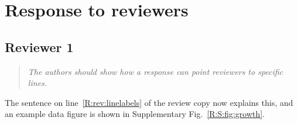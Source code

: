 \documentclass[11pt,a4paper]{article}
\newenvironment{reviewer}{\begin{quote}\itshape}{\end{quote}}
\begin{document}
\section*{Response to reviewers}

\subsection*{Reviewer 1}

\begin{reviewer}
The authors should show how a response can point reviewers to specific lines.
\end{reviewer}

\noindent The sentence on line~\ref{R:rev:linelabels} of the review copy now explains
this, and an example data figure is shown in Supplementary
Fig.~\ref{R:S:fig:growth}.
\end{document}
